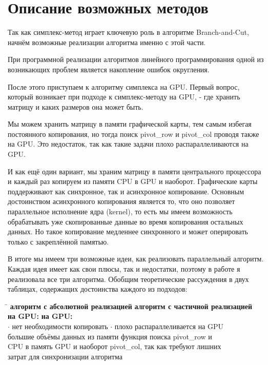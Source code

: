 \documentclass[a4paper,14pt,russian]{extreport}
\begin{document}
\section{Описание возможных методов}

Так как симплекс-метод играет ключевую роль в алгоритме Branch-and-Cut, начнём возможные реализации алгоритма именно с этой части.  
\par При программной реализации алгоритмов линейного программирования одной из возникающих проблем является накопление ошибок округления. 
\par После этого приступаем к алгоритму симплекса на GPU. Первый вопрос, который возникает при подходе к симплекс-методу на GPU, - где хранить матрицу и каких размеров она может быть. 
\par Мы можем хранить матрицу в памяти графической карты, тем самым избегая постоянного копирования, но тогда поиск pivot\_row и pivot\_col проводя также на GPU. Это недостаток, так как такие задачи плохо распараллеливаются на GPU. 
\par И как ещё один вариант, мы храним матрицу в памяти центрального процессора и каждый раз копируем из памяти CPU в GPU и наоборот. Графические карты поддерживают как синхронное, так и асинхронное копирование.  Основным достоинством асинхронного копирования является то, что оно позволяет параллельное исполнение ядра (kernel), то есть мы имеем возможность обрабатывать уже скопированные данные во время копирования остальных данных. Но такое копирование медленнее синхронного и может оперировать только с закреплённой памятью. 
\par В итоге мы имеем три возможные идеи, как реализовать параллельный алгоритм. Каждая идея имеет как свои плюсы, так и недостатки, поэтому в работе я реализовала все три алгоритма. Обобщим теоретические рассуждения в двух таблицах, содержащих достоинства каждого из подходов:
\par
  \begin{tabbing}
  \hspace{0.5\textwidth} \= \hspace{0.5\textwidth} \kill
  {\bf алгоритм с абсолютной реализацией} \> {\bf алгоритм с частичной реализацией} \\ 
  {\bf на GPU:} \> {\bf на GPU:} \\
  $\cdot$ нет необходимости копировать  \> $\cdot$ плохо распараллеливается на GPU  \\
  большие объёмы данных из памяти  \> функция поиска pivot\_row и \\
  CPU в память GPU и наоборот \> pivot\_col, так как требуют лишних  \\
   \> затрат для синхронизации алгоритма \\
  \end{tabbing}
\end{document}
